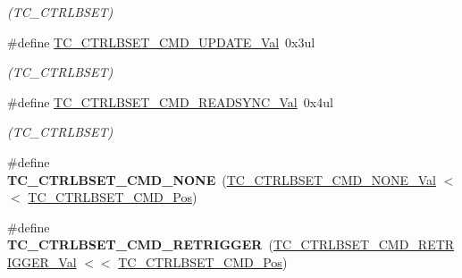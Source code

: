 \begin{DoxyCompactItemize}
\begin{DoxyCompactList}\small\item\em (T\+C\+\_\+\+C\+T\+R\+L\+B\+S\+E\+T) \end{DoxyCompactList}\item 
\hypertarget{group___s_a_m_l21___t_c_ga2bf06e089fa99c81441c3d4c6c754969}{}\#define \hyperlink{group___s_a_m_l21___t_c_ga2bf06e089fa99c81441c3d4c6c754969}{T\+C\+\_\+\+C\+T\+R\+L\+B\+S\+E\+T\+\_\+\+C\+M\+D\+\_\+\+U\+P\+D\+A\+T\+E\+\_\+\+Val}~0x3ul\label{group___s_a_m_l21___t_c_ga2bf06e089fa99c81441c3d4c6c754969}

\begin{DoxyCompactList}\small\item\em (T\+C\+\_\+\+C\+T\+R\+L\+B\+S\+E\+T) \end{DoxyCompactList}\item 
\hypertarget{group___s_a_m_l21___t_c_ga141775f4a03151dab60349caabb1b571}{}\#define \hyperlink{group___s_a_m_l21___t_c_ga141775f4a03151dab60349caabb1b571}{T\+C\+\_\+\+C\+T\+R\+L\+B\+S\+E\+T\+\_\+\+C\+M\+D\+\_\+\+R\+E\+A\+D\+S\+Y\+N\+C\+\_\+\+Val}~0x4ul\label{group___s_a_m_l21___t_c_ga141775f4a03151dab60349caabb1b571}

\begin{DoxyCompactList}\small\item\em (T\+C\+\_\+\+C\+T\+R\+L\+B\+S\+E\+T) \end{DoxyCompactList}\item 
\hypertarget{group___s_a_m_l21___t_c_gab9e1c18dd358d27a2b0bf40e6a48f0e0}{}\#define {\bfseries T\+C\+\_\+\+C\+T\+R\+L\+B\+S\+E\+T\+\_\+\+C\+M\+D\+\_\+\+N\+O\+N\+E}~(\hyperlink{group___s_a_m_l21___t_c_gaa843c0929ee48527e9f3f6ffb9e3246f}{T\+C\+\_\+\+C\+T\+R\+L\+B\+S\+E\+T\+\_\+\+C\+M\+D\+\_\+\+N\+O\+N\+E\+\_\+\+Val}      $<$$<$ \hyperlink{group___s_a_m_l21___t_c_ga300926b23e1f7430a6e8a93d73fd98cc}{T\+C\+\_\+\+C\+T\+R\+L\+B\+S\+E\+T\+\_\+\+C\+M\+D\+\_\+\+Pos})\label{group___s_a_m_l21___t_c_gab9e1c18dd358d27a2b0bf40e6a48f0e0}

\item 
\hypertarget{group___s_a_m_l21___t_c_ga1fe08462ba4191870b6a6b80624914df}{}\#define {\bfseries T\+C\+\_\+\+C\+T\+R\+L\+B\+S\+E\+T\+\_\+\+C\+M\+D\+\_\+\+R\+E\+T\+R\+I\+G\+G\+E\+R}~(\hyperlink{group___s_a_m_l21___t_c_gad87065a7d932e5e64d901a09e38552e6}{T\+C\+\_\+\+C\+T\+R\+L\+B\+S\+E\+T\+\_\+\+C\+M\+D\+\_\+\+R\+E\+T\+R\+I\+G\+G\+E\+R\+\_\+\+Val} $<$$<$ \hyperlink{group___s_a_m_l21___t_c_ga300926b23e1f7430a6e8a93d73fd98cc}{T\+C\+\_\+\+C\+T\+R\+L\+B\+S\+E\+T\+\_\+\+C\+M\+D\+\_\+\+Pos})\label{group___s_a_m_l21___t_c_ga1fe08462ba4191870b6a6b80624914df}


\end{DoxyCompactItemize}
